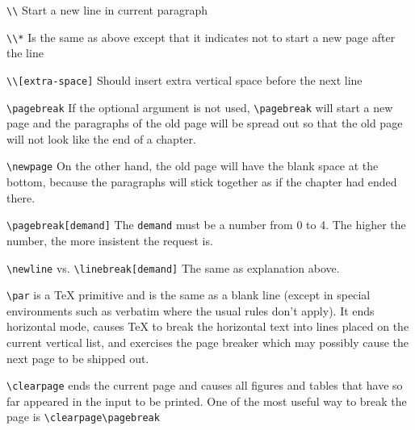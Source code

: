 \documentclass[12pt, a4paper]{article}
\begin{document}
\verb|\\| Start a new line in current paragraph

\verb|\\*| Is the same as above except that it indicates not to start a new page after the line

\verb|\\[extra-space]| Should insert extra vertical space before the next line


\verb|\pagebreak| If the optional argument is not used, \verb|\pagebreak| will start a new page and the paragraphs of the old page will be spread out so that the old page will not look like the end of a chapter.

\verb|\newpage| On the other hand, the old page will have the blank space at the bottom, because the paragraphs will stick together as if the chapter had ended there.

\verb|\pagebreak[demand]| The \verb|demand| must be a number from 0 to 4. The higher the number, the more insistent the request is.

\verb|\newline| vs. \verb|\linebreak[demand]| The same as explanation above.


\verb|\par| is a TeX primitive and is the same as a blank line (except in special environments such as verbatim where the usual rules don't apply). It ends horizontal mode, causes TeX to break the horizontal text into lines placed on the current vertical list, and exercises the page breaker which may possibly cause the next page to be shipped out.


\verb|\clearpage| ends the current page and causes all figures and tables that have so far appeared in the input to be printed. One of the most useful way to break the page is \verb|\clearpage\pagebreak|
\end{document}
